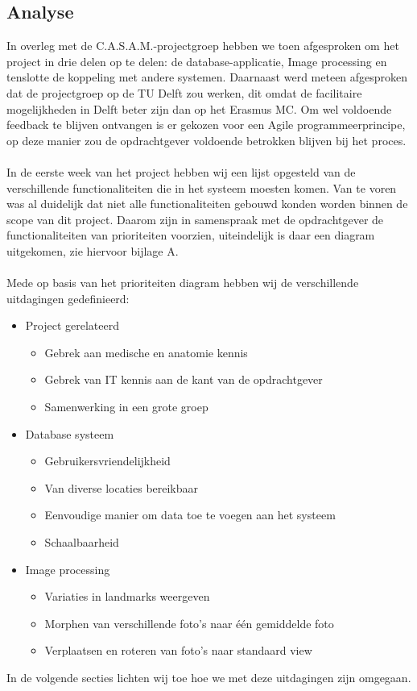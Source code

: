 \subsection{Analyse}
In overleg met de C.A.S.A.M.-projectgroep hebben we toen afgesproken om het project in drie delen op te delen: de database-applicatie, Image processing en tenslotte de koppeling met andere systemen. 
Daarnaast werd meteen afgesproken dat de projectgroep op de TU Delft zou werken, dit omdat de facilitaire mogelijkheden in Delft beter zijn dan op het Erasmus MC. 
Om wel voldoende feedback te blijven ontvangen is er gekozen voor een Agile programmeerprincipe, op deze manier zou de opdrachtgever voldoende betrokken blijven bij het proces.
\\
\\
In de eerste week van het project hebben wij een lijst opgesteld van de verschillende functionaliteiten die in het systeem moesten komen. 
Van te voren was al duidelijk dat niet alle functionaliteiten gebouwd konden worden binnen de scope van dit project. 
Daarom zijn in samenspraak met de opdrachtgever de functionaliteiten van prioriteiten voorzien, uiteindelijk is daar een diagram uitgekomen, zie hiervoor bijlage A.
\\
\\
Mede op basis van het prioriteiten diagram hebben wij de verschillende uitdagingen gedefinieerd:
\begin{itemize}
  \item Project gerelateerd
  \begin{itemize}
    \item Gebrek aan medische en anatomie kennis
    \item Gebrek van IT kennis aan de kant van de opdrachtgever
    \item Samenwerking in een grote groep
  \end{itemize}
  \item Database systeem
  \begin{itemize}
    \item Gebruikersvriendelijkheid
    \item Van diverse locaties bereikbaar
    \item Eenvoudige manier om data toe te voegen aan het systeem
    \item Schaalbaarheid
  \end{itemize}
  \item Image processing
  \begin{itemize}
    \item Variaties in landmarks weergeven
    \item Morphen van verschillende foto's naar \'{e}\'{e}n gemiddelde foto
    \item Verplaatsen en roteren van foto's naar standaard view
  \end{itemize}
\end{itemize}
In de volgende secties lichten wij toe hoe we met deze uitdagingen zijn omgegaan.
